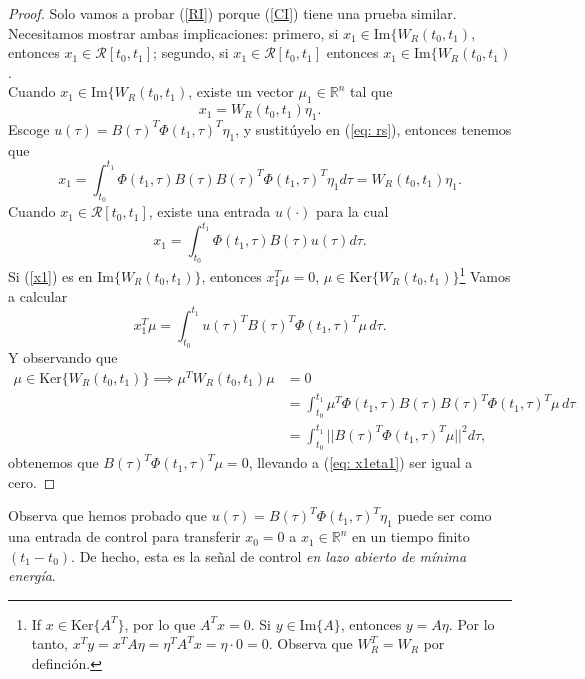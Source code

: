 \begin{proof}
	Solo vamos a probar (\ref{RI}) porque (\ref{CI}) tiene una prueba similar.
	Necesitamos mostrar ambas implicaciones: primero, si $x_1 \in \text{Im}\{W_R(t_0,t_1)$, entonces $x_1 \in \mathcal{R}[t_0,t_1]$; segundo, si $x_1 \in \mathcal{R}[t_0,t_1]$ entonces $x_1 \in \text{Im}\{W_R(t_0,t_1)$.\\
	Cuando  $x_1 \in \text{Im}\{W_R(t_0,t_1)$, existe un vector $\mu_1\in\mathbb{R}^n$ tal que
	\begin{equation}
	x_1 = W_R(t_0,t_1)\eta_1.
	\end{equation}
	Escoge $u(\tau) = B(\tau)^T\Phi(t_1, \tau)^T\eta_1$, y sustitúyelo en (\ref{eq: rs}), entonces tenemos que 
	\begin{equation}
	x_1 = \int_{t_0}^{t_1} \Phi(t_1,\tau)B(\tau) B(\tau)^T\Phi(t_1, \tau)^T \eta_1d\tau = W_R(t_0,t_1)\eta_1.
	\end{equation}
	Cuando $x_1 \in \mathcal{R}[t_0,t_1]$, existe una entrada $u(\cdot)$ para la cual 
	\begin{equation}
		x_1 = \int_{t_0}^{t_1} \Phi(t_1,\tau)B(\tau)u(\tau)d\tau.
		\label{x1}
	\end{equation}
	Si (\ref{x1}) es en $\text{Im}\{W_R(t_0,t_1)\}$, entonces $x_1^T\mu = 0, \, \mu \in \text{Ker}\{W_R(t_0,t_1)\}$\footnote{If $x\in\text{Ker}\{A^T\}$, por lo que $A^Tx = 0$. Si $y\in\text{Im}\{A\}$, entonces  $y = A\eta$. Por lo tanto, $x^Ty = x^TA\eta = \eta^TA^Tx = \eta \cdot 0 = 0$. Observa que $W_R^T = W_R$ por definción.} Vamos a calcular 
	\begin{equation}
		x_1^T\mu = \int_{t_0}^{t_1}u(\tau)^TB(\tau)^T\Phi(t_1,\tau)^T\mu \, d\tau. \label{eq: x1eta1}
	\end{equation}
	Y observando que 
	\begin{align}
	\mu \in \text{Ker}\{W_R(t_0,t_1)\} \implies \mu^TW_R(t_0,t_1)\mu &= 0 \nonumber \\ &= \int_{t_0}^{t_1}\mu^T \Phi(t_1,\tau)B(\tau)B(\tau)^T\Phi(t_1,\tau)^T \mu \, d\tau \nonumber \\ &= \int_{t_0}^{t_1} ||B(\tau)^T\Phi(t_1,\tau)^T \mu||^2 d \tau,
	\end{align}
	obtenemos que $B(\tau)^T\Phi(t_1,\tau)^T \mu  = 0$, llevando a (\ref{eq: x1eta1}) ser igual a cero.
\end{proof}
\begin{remark}
	Observa que hemos probado que $u(\tau) = B(\tau)^T\Phi(t_1,\tau)^T \eta_1$ puede ser como una entrada de control para transferir $x_0 = 0$ a $x_1\in\mathbb{R}^n$ en un tiempo finito $(t_1 - t_0)$. De hecho, esta es la señal de control \emph{en lazo abierto de mínima energía}.
\end{remark}

